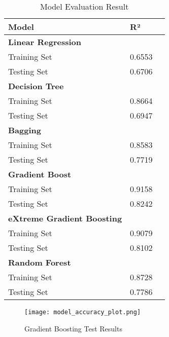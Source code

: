 \documentclass[conference]{IEEEtran}
\begin{document}
    \begin{table}[h]
        \centering
        \renewcommand{\arraystretch}{1.1}
        \begin{tabular}{
            | p{}
            | p{}
            | p{} |
            }
            \hline
            \textbf{Model} & \textbf{R²} \\
            \hline
            \multicolumn{1}{|l}{\textbf{Linear Regression}} \\
            \hline
            Training Set   & 0.6553 \\
            \hline
            Testing Set & 0.6706 \\
            \hline
            \multicolumn{1}{|l}{\textbf{Decision Tree}}\\
            \hline
            Training Set & 0.8664 \\
            \hline
            Testing Set & 0.6947 \\
            \hline
            \multicolumn{1}{|l}{\textbf{Bagging}} \\
            \hline
            Training Set & 0.8583 \\
            \hline
            Testing Set & 0.7719 \\
            \hline
            \multicolumn{1}{|l}{\textbf{Gradient Boost}}\\
            \hline
            Training Set & 0.9158 \\
            \hline
            Testing Set & 0.8242 \\
            \hline
            \multicolumn{1}{|l}{\textbf{eXtreme Gradient Boosting}}\\
            \hline
            Training Set & 0.9079 \\
            \hline
            Testing Set & 0.8102 \\
            \hline
            \multicolumn{1}{|l}{\textbf{Random Forest}}\\
            \hline
            Training Set & 0.8728 \\
            \hline
            Testing Set & 0.7786 \\
            \hline
        \end{tabular}
    \caption{Model Evaluation Result}
    \end{table}

    \begin{figure}[h]
        \centering
        \texttt{[image: model\_accuracy\_plot.png]}
        \caption{Gradient Boosting Test Results}
        \label{fig:gradient_boosting_test}
    \end{figure}
\end{document}
